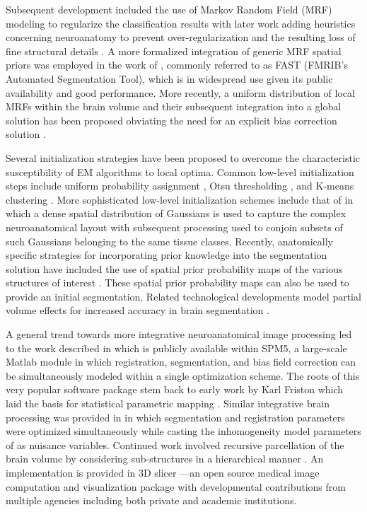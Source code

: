 \documentclass[11pt,english]{article}
\begin{document}
Subsequent development included the use of Markov Random Field (MRF)  modeling \citep{Geman1984}
to regularize the classification results \citep{Held1997} with later work adding heuristics concerning neuroanatomy to prevent 
over-regularization and the resulting loss of fine structural details \citep{Leemput1999,Leemput1999a}.  
A more formalized integration of generic MRF spatial priors was employed in the work of \cite{Zhang2001}, 
commonly referred to as FAST (FMRIB's Automated Segmentation Tool), which is in widespread use
given its public availability and good performance.  More recently, a uniform distribution of local MRFs within the brain volume and their subsequent integration into a global solution has been proposed obviating the need for an 
explicit bias correction solution \citep{Scherrer2009}.  

Several initialization strategies have been proposed to overcome the characteristic
susceptibility of EM algorithms to local optima.   Common low-level initialization steps 
include uniform probability assignment \citep{Wells1996},
Otsu thresholding \citep{Zhang2001}, and K-means clustering
\citep{Pappas1992}.  More sophisticated low-level initialization
schemes include that of \cite{Greenspan2006} in which a dense spatial
distribution of Gaussians is used to capture the complex
neuroanatomical layout with subsequent processing used to conjoin
subsets of such Gaussians belonging to the same tissue classes.  Recently,
anatomically specific strategies for incorporating prior knowledge
into the segmentation solution have included the use of spatial prior
probability maps of the various structures of interest
\citep{Leemput1999a,Marroquin2002,Ashburner2005}.  These spatial prior
probability maps can also be used to provide an initial segmentation.
Related technological developments model partial volume effects for
increased accuracy in brain segmentation
\citep{Ruan2000,Ballester2002,Leemput2003}.

A general trend towards more integrative neuroanatomical image processing led to the work described in
\cite{Ashburner2005} which is publicly available within SPM5, a
large-scale Matlab module in which registration, segmentation, and
bias field correction can be simultaneously modeled within a single
optimization scheme. The roots of this very popular software package
stem back to early work by Karl Friston which laid the basis for
statistical parametric mapping \citep{Friston1990}. 
 Similar integrative brain processing was provided in \cite{Pohl2006} in which
segmentation and registration parameters were optimized simultaneously
while casting the inhomogeneity model parameters of \cite{Wells1996}
as nuisance variables.  Continued work involved recursive parcellation
of the brain volume by considering sub-structures in a hierarchical
manner \citep{Pohl2007}.  An implementation is provided in 3D slicer
\citep{Pieper2006}---an open source medical image computation and
visualization package with developmental
contributions from multiple agencies including both private and
academic institutions.
\end{document}

